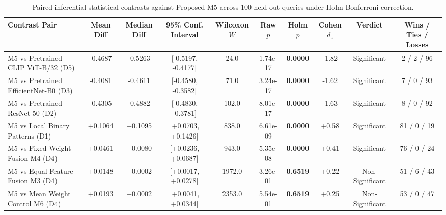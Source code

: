 \begin{table}[!t]
\centering
\caption{Paired inferential statistical contrasts against Proposed M5 across 100 held-out queries under Holm-Bonferroni correction.}
\label{tab:statistical_validation}
\begin{tabular}{lccccccccc}
\toprule
\textbf{Contrast Pair} & \textbf{Mean Diff} & \textbf{Median Diff} & \textbf{95\% Conf. Interval} & \textbf{Wilcoxon $W$} & \textbf{Raw $p$} & \textbf{Holm $p$} & \textbf{Cohen $d_z$} & \textbf{Verdict} & \textbf{Wins / Ties / Losses} \\
\midrule
M5 vs Pretrained CLIP ViT-B/32 (D5) & -0.4687 & -0.5263 & [-0.5197, -0.4177] & 24.0 & 1.74e-17 & \textbf{0.0000} & -1.82 & Significant & 2 / 2 / 96 \\
M5 vs Pretrained EfficientNet-B0 (D3) & -0.4081 & -0.4611 & [-0.4580, -0.3582] & 71.0 & 3.24e-17 & \textbf{0.0000} & -1.62 & Significant & 7 / 0 / 93 \\
M5 vs Pretrained ResNet-50 (D2) & -0.4305 & -0.4882 & [-0.4830, -0.3781] & 102.0 & 8.01e-17 & \textbf{0.0000} & -1.63 & Significant & 8 / 0 / 92 \\
M5 vs Local Binary Patterns (D1) & +0.1064 & +0.1095 & [+0.0703, +0.1426] & 838.0 & 6.61e-09 & \textbf{0.0000} & +0.58 & Significant & 81 / 0 / 19 \\
M5 vs Fixed Weight Fusion M4 (D4) & +0.0461 & +0.0080 & [+0.0236, +0.0687] & 943.0 & 5.35e-08 & \textbf{0.0000} & +0.41 & Significant & 76 / 0 / 24 \\
M5 vs Equal Feature Fusion M3 (D4) & +0.0148 & +0.0002 & [+0.0017, +0.0278] & 1972.0 & 3.26e-01 & \textbf{0.6519} & +0.22 & Non-Significant & 51 / 6 / 43 \\
M5 vs Mean Weight Control M6 (D4) & +0.0193 & +0.0002 & [+0.0041, +0.0344] & 2353.0 & 5.54e-01 & \textbf{0.6519} & +0.25 & Non-Significant & 53 / 0 / 47 \\
\bottomrule
\end{tabular}
\end{table}